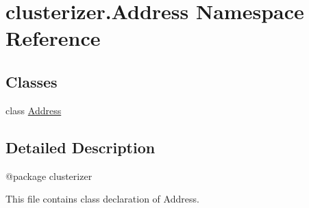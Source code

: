\hypertarget{namespaceclusterizer_1_1Address}{}\section{clusterizer.\+Address Namespace Reference}
\label{namespaceclusterizer_1_1Address}
\subsection*{Classes}
\begin{DoxyCompactItemize}
\item 
class \hyperlink{classclusterizer_1_1Address_1_1Address}{Address}
\end{DoxyCompactItemize}


\subsection{Detailed Description}
\begin{DoxyVerb}@package clusterizer

This file contains class declaration of Address.
\end{DoxyVerb}
 